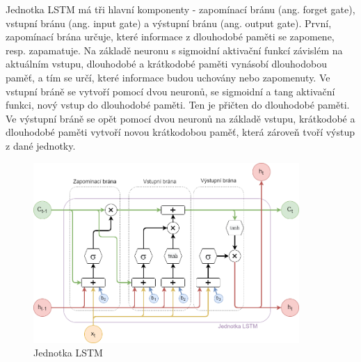 Jednotka LSTM má tři hlavní komponenty - zapomínací bránu (ang. forget gate),
vstupní bránu (ang. input gate) a výstupní bránu (ang. output gate). První,
zapomínací brána určuje, které informace z dlouhodobé paměti se zapomene, resp.
zapamatuje. Na základě neuronu s sigmoidní aktivační funkcí závislém na
aktuálním vstupu, dlouhodobé a krátkodobé paměti vynásobí dlouhodobou paměť, a
tím se určí, které informace budou uchovány nebo zapomenuty. Ve vstupní bráně
se vytvoří pomocí dvou neuronů, se sigmoidní a tang aktivační funkci, nový
vstup do dlouhodobé paměti. Ten je přičten do dlouhodobé paměti. Ve výstupní
bráně se opět pomocí dvou neuronů na základě vstupu, krátkodobé a dlouhodobé
paměti vytvoří novou krátkodobou paměť, která zároveň tvoří výstup z dané
jednotky.

\begin{figure}[]
    \centering
    \includegraphics[width=0.9\textwidth]{Figures/LSTM_unit.png}
    \caption{Jednotka LSTM}
    \label{fig:lstm_unit}
\end{figure}

\endinput